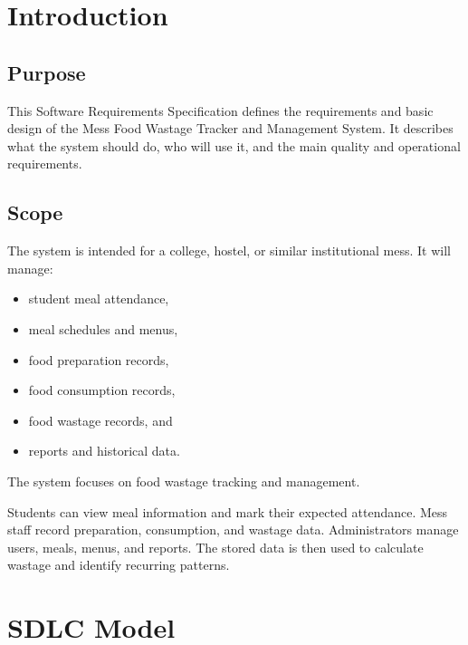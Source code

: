 \documentclass[12pt,a4paper]{report}
\begin{document}
	
	\chapter{Introduction}
	
	\section{Purpose}
	
	This Software Requirements Specification defines the requirements and basic design of the Mess Food Wastage Tracker and Management System. It describes what the system should do, who will use it, and the main quality and operational requirements.
	
	\section{Scope}
	
	The system is intended for a college, hostel, or similar institutional mess. It will manage:
	
	\begin{itemize}[leftmargin=*]
		\item student meal attendance,
		\item meal schedules and menus,
		\item food preparation records,
		\item food consumption records,
		\item food wastage records, and
		\item reports and historical data.
	\end{itemize}
	
	The system focuses on food wastage tracking and management.

	Students can view meal information and mark their expected attendance. Mess staff record preparation, consumption, and wastage data. Administrators manage users, meals, menus, and reports. The stored data is then used to calculate wastage and identify recurring patterns.
	
	
	\chapter{SDLC Model}
	
\end{document}
